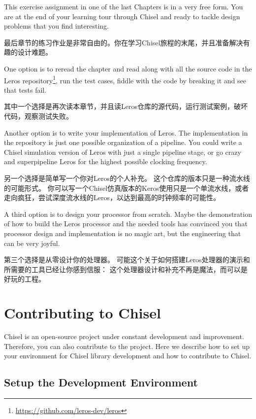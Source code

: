 \documentclass[%
    10pt,
    headinclude, footexclude,
    openright, %
    notitlepage,
    cleardoubleempty,
    headsepline,
    pointlessnumbers,
    bibtotoc, idxtotoc,
    ]{scrbook}
\newcommand{\myref}[2]{\href{#1}{#2}}
\renewcommand{\myref}[2]{{#2}{\footnote{\url{#1}}}}
\begin{document}
This exercise assignment in one of the last Chapters is in a very free form. You are at the end
of your learning tour through Chisel and ready to tackle design problems that
you find interesting.

最后章节的练习作业是非常自由的。你在学习Chisel旅程的末尾，并且准备解决有趣的设计难题。

One option is to reread the chapter and read along with all the source code in the
\myref{https://github.com/leros-dev/leros}{Leros repository}, run the test cases,
fiddle with the code by breaking it and see that tests fail.

其中一个选择是再次读本章节，并且读Leros仓库的源代码，运行测试案例，破坏代码，观察测试失败。

Another option is to write your implementation of Leros.
The implementation in the repository is just one possible organization of a pipeline.
You could write a Chisel simulation version of Leros with just a single pipeline stage,
or go crazy and superpipeline Leros for the highest possible clocking frequency.

另一个选择是简单写一个你对Leros的个人补充。
这个仓库的版本只是一种流水线的可能形式。
你可以写一个Chisel仿真版本的Keros使用只是一个单流水线，或者走向疯狂，尝试深度流水线的Leros，以达到最高的时钟频率的可能性。


A third option is to design your processor from scratch. Maybe the demonstration of
how to build the Leros processor and the needed tools has convinced you that processor
design and implementation is no magic art, but the engineering that can be very joyful.

第三个选择是从零设计你的处理器。
可能这个关于如何搭建Leros处理器的演示和所需要的工具已经让你感到信服：
这个处理器设计和补充不再是魔法，而可以是好玩的工程。

\chapter{Contributing to Chisel}

Chisel is an open-source project under constant development and improvement.
Therefore, you can also contribute to the project. Here we describe how to
set up your environment for Chisel library development and how to contribute
to Chisel.

\section{Setup the Development Environment}
\end{document}
